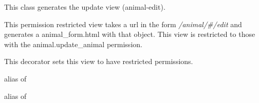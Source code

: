 \documentclass[letterpaper,10pt,english]{sphinxmanual}
\begin{document}
\begin{fulllineitems}
\label{animals:mousedb.animal.views.AnimalUpdate}
This class generates the update {\hyperref[animals:mousedb.animal.models.Animal]{}} view (animal-edit).

This permission restricted view takes a url in the form \emph{/animal/\#/edit} and generates a animal\_form.html with that object.
This view is restricted to those with the animal.update\_animal permission.

\begin{fulllineitems}
\label{animals:mousedb.animal.views.AnimalUpdate.dispatch}
This decorator sets this view to have restricted permissions.

\end{fulllineitems}


\begin{fulllineitems}
\label{animals:mousedb.animal.views.AnimalUpdate.form_class}
alias of 

\end{fulllineitems}


\begin{fulllineitems}
\label{animals:mousedb.animal.views.AnimalUpdate.model}
alias of 

\end{fulllineitems}


\end{fulllineitems}

\end{document}
